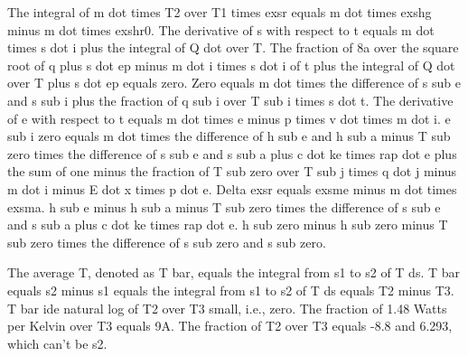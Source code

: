 The integral of m dot times T2 over T1 times exsr equals m dot times exshg minus m dot times exshr0.
The derivative of s with respect to t equals m dot times s dot i plus the integral of Q dot over T.
The fraction of 8a over the square root of q plus s dot ep minus m dot i times s dot i of t plus the integral of Q dot over T plus s dot ep equals zero.
Zero equals m dot times the difference of s sub e and s sub i plus the fraction of q sub i over T sub i times s dot t.
The derivative of e with respect to t equals m dot times e minus p times v dot times m dot i.
e sub i zero equals m dot times the difference of h sub e and h sub a minus T sub zero times the difference of s sub e and s sub a plus c dot ke times rap dot e plus the sum of one minus the fraction of T sub zero over T sub j times q dot j minus m dot i minus E dot x times p dot e.
Delta exsr equals exsme minus m dot times exsma.
h sub e minus h sub a minus T sub zero times the difference of s sub e and s sub a plus c dot ke times rap dot e.
h sub zero minus h sub zero minus T sub zero times the difference of s sub zero and s sub zero.

The average T, denoted as T bar, equals the integral from s1 to s2 of T ds.
T bar equals s2 minus s1 equals the integral from s1 to s2 of T ds equals T2 minus T3.
T bar ide natural log of T2 over T3 small, i.e., zero.
The fraction of 1.48 Watts per Kelvin over T3 equals 9A.
The fraction of T2 over T3 equals -8.8 and 6.293, which can't be s2.